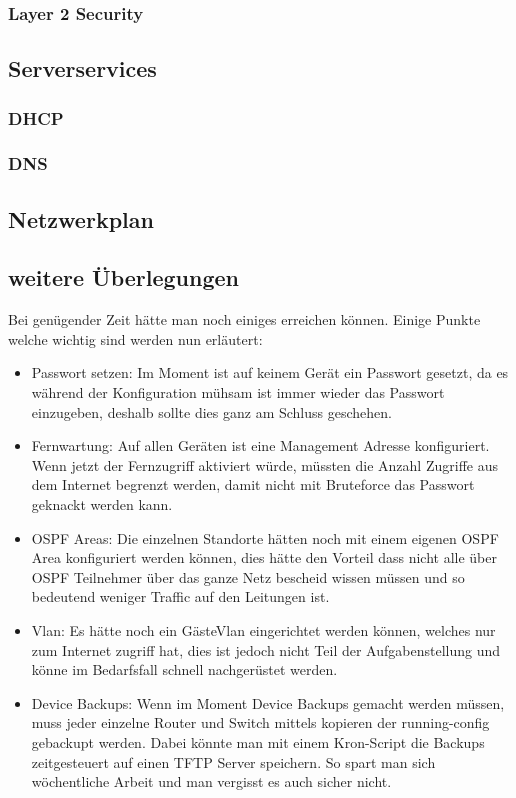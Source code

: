 \documentclass[12pt,a4paper,titlepage]{article}
\begin{document}
\subsubsection{Layer 2 Security}
\subsection{Serverservices}
\subsubsection{DHCP}
\subsubsection{DNS}
\subsection{Netzwerkplan}
\subsection{weitere Überlegungen}

Bei genügender Zeit hätte man noch einiges erreichen können. Einige Punkte welche wichtig sind werden nun erläutert:
\begin{itemize}
\item Passwort setzen: Im Moment ist auf keinem Gerät ein Passwort gesetzt, da es während der Konfiguration mühsam ist immer wieder das Passwort einzugeben, deshalb sollte dies ganz am Schluss geschehen.
\item Fernwartung: Auf allen Geräten ist eine Management Adresse konfiguriert. Wenn jetzt der Fernzugriff aktiviert würde, müssten die Anzahl Zugriffe aus dem Internet begrenzt werden, damit nicht mit Bruteforce das Passwort geknackt werden kann.
\item OSPF Areas: Die einzelnen Standorte hätten noch mit einem eigenen OSPF Area konfiguriert werden können, dies hätte den Vorteil dass nicht alle über OSPF Teilnehmer über das ganze Netz bescheid wissen müssen und so bedeutend weniger Traffic auf den Leitungen ist.
\item Vlan: Es hätte noch ein GästeVlan eingerichtet werden können, welches nur zum Internet zugriff hat, dies ist jedoch nicht Teil der Aufgabenstellung und könne im Bedarfsfall schnell nachgerüstet werden.
\item Device Backups: Wenn im Moment Device Backups gemacht werden müssen, muss jeder einzelne Router und Switch mittels kopieren der running-config gebackupt werden. Dabei könnte man mit einem Kron-Script die Backups zeitgesteuert auf einen TFTP Server speichern. So spart man sich wöchentliche Arbeit und man vergisst es auch sicher nicht.
\end{itemize}
\end{document}
